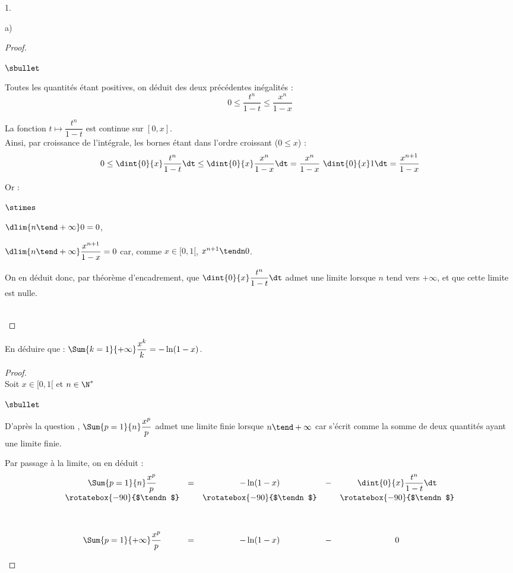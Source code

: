 \documentclass[11pt]{article}%
\begin{document}
\begin{noliste}{1.}
\begin{noliste}{a)}
\begin{proof}
\begin{noliste}{$\sbullet$}
      \item Toutes les quantités étant positives, on déduit des deux
        précédentes inégalités :
        \[
        0 \leq \dfrac{t^n}{1-t} \leq \dfrac{x^n}{1-x}
        \]

      \item La fonction $t \mapsto \dfrac{t^n}{1-t}$ est continue sur
        $[0, x]$.\\
        Ainsi, par croissance de l'intégrale, les bornes étant dans
        l'ordre croissant ($0 \leq x$) :
        \[
        0 \leq \dint{0}{x} \dfrac{t^n}{1-t} \dt \leq \dint{0}{x}
        \dfrac{x^n}{1-x} \dt = \dfrac{x^n}{1-x} \ \dint{0}{x} 1 \dt =
        \dfrac{x^{n+1}}{1-x}
        \]

      \item Or :
        \begin{noliste}{$\stimes$}
        \item $\dlim{n \tend +\infty} 0 = 0$,
        \item $\dlim{n \tend +\infty} \dfrac{x^{n+1}}{1-x} = 0$ car,
          comme $x \in [0, 1[$, $x^{n+1} \tendn 0$.
        \end{noliste}
        On en déduit donc, par théorème d'encadrement, que
        $\dint{0}{x} \dfrac{t^n}{1-t} \dt$ admet une limite lorsque
        $n$ tend vers $+\infty$, et que cette limite est nulle.
      \end{noliste}
      \conc{$\forall x \in [0,1[$, $\dlim{n \tend +\infty} \dint{0}{x}
        \dfrac{t^n}{1-t} \dt = 0$}%
      ~\\[-1.4cm]
    \end{proof}

  \item En déduire que : $\Sum{k = 1}{+ \infty}\dfrac{x^k}{k} =
    -\ln(1-x)$.

    \begin{proof}~\\
      Soit $x \in [0, 1[$ et $n \in \N^*$
      \begin{noliste}{$\sbullet$}
      \item D'après la question , $\Sum{p = 1}{n}
        \dfrac{x^{p}}{p}$ admet une limite finie lorsque $n \tend
        +\infty$ car s'écrit comme la somme de deux quantités ayant
        une limite finie.

      \item Par passage à la limite, on en déduit :
        \[
        \begin{array}{ccccc}
          \Sum{p = 1}{n} \dfrac{x^{p}}{p} & = & - \ln(1-x) & - &
          \dint{0}{x} \dfrac{t^{n}}{1-t} \dt 
          \\[.2cm]
          \rotatebox{-90}{$\tendn$} & & \rotatebox{-90}{$\tendn$} & &
          \rotatebox{-90}{$\tendn$} 
          \\[1.2cm]
          \Sum{p = 1}{+\infty} \dfrac{x^{p}}{p} & = & - \ln(1-x) & - &
          0
        \end{array}
        \]


\end{noliste}
\end{proof}
\end{noliste}
\end{noliste}
\end{document}
